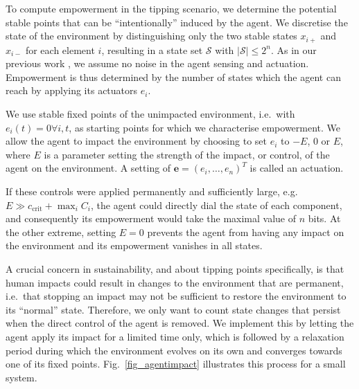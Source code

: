 \documentclass[conference]{IEEEtran}
\newcommand{\vectorsym}[1]{\ensuremath{\mathbf{#1}}}
\newcommand{\ccrit}{\ensuremath{c_{\mathrm{crit}}}}
\newcommand{\agentimpact}{\ensuremath{e}}
\newcommand{\setsymbol}[1]{\ensuremath{\mathcal{#1}}}
\newcommand{\stateset}{\ensuremath{\setsymbol{S}}}
\newcommand{\couplingfunction}{\ensuremath{C}}
\newcommand{\impactstrength}{\ensuremath{E}}
\begin{document}

To compute empowerment in the tipping scenario, we determine the
potential stable points that can be ``intentionally'' induced by the
agent. We discretise the state of the environment by distinguishing
only the two stable states $x_{i+}$ and $x_{i-}$ for each element $i$,
resulting in a state set $\stateset$ with $|\stateset| \le 2^n$. As in
our previous work \cite{Kim2009_sustainability}, we assume no noise in
the agent sensing and actuation. Empowerment is thus determined by the
number of states which the agent can reach by applying its actuators
$\agentimpact_i$.

We use stable fixed points of the unimpacted environment, i.e.\ with
$\agentimpact_i(t) = 0 \forall i, t$, as starting points for which we
characterise empowerment. We allow the agent to impact the environment
by choosing to set $\agentimpact_i$ to $-\impactstrength$, $0$ or
$\impactstrength$, where $\impactstrength$ is a parameter setting the strength of
the impact, or control, of the agent on the environment. A setting of
$\vectorsym{\agentimpact} = (\agentimpact_i, \ldots,
\agentimpact_n)^T$ is called an actuation.

If these controls were applied permanently and sufficiently large,
e.g. $\impactstrength \gg \ccrit + \max_i \couplingfunction_i$, the agent could directly dial the
state of each component, and consequently its empowerment would take
the maximal value of $n$ bits. At the other extreme, setting $\impactstrength = 0$
prevents the agent from having any impact on the environment and its
empowerment vanishes in all states.

A crucial concern in sustainability, and about tipping points
specifically, is that human impacts could result in changes to the
environment that are permanent, i.e.\ that stopping an impact may not
be sufficient to restore the environment to its ``normal'' state.
Therefore, we only want to count state changes that persist when the
direct control of the agent is removed. We implement this by letting
the agent apply its impact for a limited time only, which is followed
by a relaxation period during which the environment evolves on its own
and converges towards one of its fixed points.
Fig.~\ref{fig_agentimpact} illustrates this process for a small
system.
\end{document}
